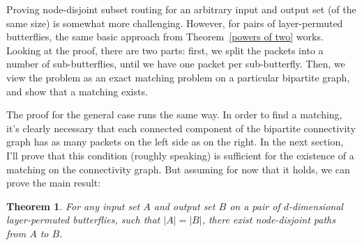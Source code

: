 \documentclass[12pt]{article}
\newtheorem{theorem}{Theorem}
\begin{document}
Proving node-disjoint 
subset routing for an arbitrary input and output set (of the same 
size) is somewhat more challenging.  However, 
for pairs of layer-permuted butterflies,
the same basic approach
from Theorem~\ref{powers of two} works.  Looking at the proof, there are
two parts: first, we split the packets into a number of sub-butterflies,
until we have one packet per sub-butterfly.  Then, we view the 
problem as an
exact matching problem on a particular bipartite graph, and show that
a matching exists.  

The proof for the general case runs the same way.  In order to find 
a matching, it's clearly necessary that each connected component
of the bipartite connectivity graph has as many packets 
on the left side as on the right.  
In the next section, I'll prove that this condition (roughly speaking)
is sufficient for the existence of a matching on the 
connectivity graph.
But assuming for now that it holds, we can prove the main result:
\begin{theorem} \label{main}
For any input set $A$ and output set $B$ on a pair of $d$-dimensional 
layer-permuted butterflies,
such that $|A|=|B|$, there exist node-disjoint paths from $A$ to
$B$.
\end{theorem}
\end{document}
